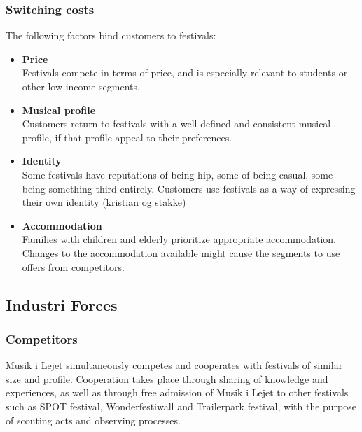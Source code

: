 \subsubsection{Switching costs}
The following factors bind customers to festivals:
\begin{itemize}
	\item \textbf{Price}\\
	Festivals compete in terms of price, and is especially relevant to students or other low income segments.
	\item \textbf{Musical profile}\\
	Customers return to festivals with a well defined and consistent musical profile, if that profile appeal to their preferences.
	\item \textbf{Identity}\\
	Some festivals have reputations of being hip, some of being casual, some being something third entirely. Customers use festivals as a way of expressing their own identity (kristian og stakke)
	\item \textbf{Accommodation}\\
	Families with children and elderly prioritize appropriate accommodation. Changes to the accommodation available might cause the segments to use offers from competitors.
\end{itemize}
\subsection{Industri Forces}
\subsubsection{Competitors}
Musik i Lejet simultaneously competes and cooperates with festivals of similar size and profile. Cooperation takes place through sharing of knowledge and experiences, as well as through free admission of Musik i Lejet to other festivals such as SPOT festival, Wonderfestiwall and Trailerpark festival, with the purpose of scouting acts and observing processes.

